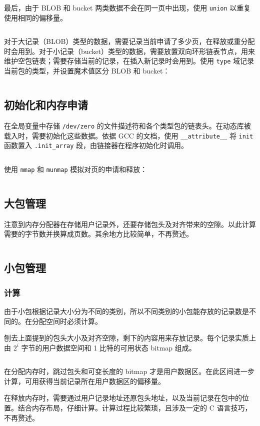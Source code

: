 \documentclass[12pt, a4paper]{article}
\newcommand{\LabSrc}[1]{\inputminted[fontsize=\scriptsize, breaklines]{c}{./src/#1.c}}
\begin{document}
最后，由于 BLOB 和 bucket 两类数据不会在同一页中出现，使用 \texttt{union} 以重复使用相同的偏移量。

\LabSrc{bag}

对于大记录（BLOB）类型的数据，需要记录当前申请了多少页，在释放或重分配时会用到。对于小记录（bucket）类型的数据，需要放置双向环形链表节点，用来维护空包链表；需要存储当前的记录，在插入新记录时会用到。使用 \texttt{type} 域记录当前包的类型，并设置魔术值区分 BLOB 和 bucket：

\LabSrc{bag_def}

\subsection{初始化和内存申请}
在全局变量中存储 \texttt{/dev/zero} 的文件描述符和各个类型包的链表头。在动态库被载入时，需要初始化这些数据。依据 GCC 的文档，使用 \texttt{\_\_attribute\_\_} 将 \texttt{init} 函数置入 \texttt{.init\_array} 段，由链接器在程序初始化时调用。

\LabSrc{init}

使用 \texttt{mmap} 和 \texttt{munmap} 模拟对页的申请和释放：

\LabSrc{mem}

\subsection{大包管理}
注意到内存分配器在存储用户记录外，还要存储包头及对齐带来的空隙。以此计算需要的字节数并换算成页数。其余地方比较简单，不再赘述。


\LabSrc{blob}

\subsection{小包管理}
\subsubsection{计算}
由于小包根据记录大小分为不同的类别，所以不同类别的小包能存放的记录数是不同的。在分配空间时必须计算。

刨去上面提到的包头大小及对齐空隙，剩下的内容用来存放记录。每个记录实质上由 $2^i$ 字节的用户数据空间和 1 比特的可用状态 bitmap 组成。

\LabSrc{buck_calc}

在分配内存时，跳过包头和可变长度的 bitmap 才是用户数据区。在此区间进一步计算，可用获得当前记录所在用户数据区的偏移量。

在释放内存时，需要通过用户记录地址还原包头地址，以及当前记录在包中的位置。结合内存布局，仔细计算。计算过程比较繁琐，且涉及一定的 C 语言技巧，不再赘述。
\end{document}
